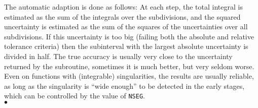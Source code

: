 \Method
The automatic adaption is done as follows: At each step, the total
integral is estimated as the sum of the integrals over the
subdivisions, and the squared uncertainty is estimated as the sum
of the squares of the uncertainties over all subdivisions. If this
uncertainty is too big (failing both the absolute and relative
tolerance criteria) then the subinterval with the largest absolute
uncertainty is divided in half.
\newpage
\Accuracy
The true accuracy is usually very close to the uncertainty returned
by the subroutine, sometimes it is much better, but very seldom
worse. Even on functions with (integrable) singularities, the results
are usually reliable, as long as the singularity is ``wide enough''
to be detected in the early stages, which can be controlled by the
value of {\tt NSEG}.
\\ $\bullet$
